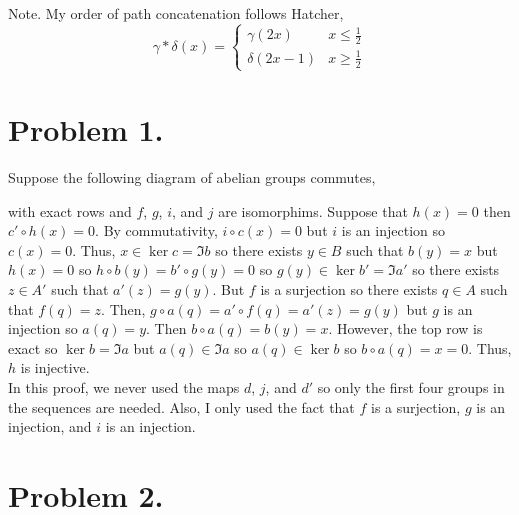 \documentclass[12pt]{extarticle}
\begin{document}

Note. My order of path concatenation follows Hatcher,
\[\gamma * \delta(x) = \begin{cases}
\gamma(2x) & x \le \tfrac{1}{2} \\
\delta(2x - 1) & x \ge \tfrac{1}{2}
\end{cases}\]
 
\section*{Problem 1.}

Suppose the following diagram of abelian groups commutes,
\begin{center}
\end{center}  
with exact rows and $f$, $g$, $i$, and $j$ are isomorphims. Suppose that $h(x) = 0$ then $c' \circ h(x) = 0$. By commutativity, $i \circ c(x) = 0$ but $i$ is an injection so $c(x) = 0$. Thus, $x \in \ker{c} = \Im{b}$ so there exists $y \in B$ such that $b(y) = x$ but $h(x) = 0$ so $h \circ b(y) = b' \circ g (y) = 0$ so $g(y) \in \ker{b'} = \Im{a'}$ so there exists $z \in A'$ such that $a'(z) = g(y)$. But $f$ is a surjection so there exists $q \in A$ such that $f(q) = z$. Then, $g \circ a(q) = a' \circ f(q) = a'(z) = g(y)$ but $g$ is an injection so $a(q) = y$. Then $b \circ a(q) = b(y) = x$. However, the top row is exact so $\ker{b} = \Im{a}$ but $a(q) \in \Im{a}$ so $a(q) \in \ker{b}$ so $b \circ a(q) = x = 0$. Thus, $h$ is injective. \bigskip\\
In this proof, we never used the maps $d$, $j$, and $d'$ so only the first four groups in the sequences are needed. Also, I only used the fact that $f$ is a surjection, $g$ is an injection, and $i$ is an injection.  
\section*{Problem 2.}
\end{document}
